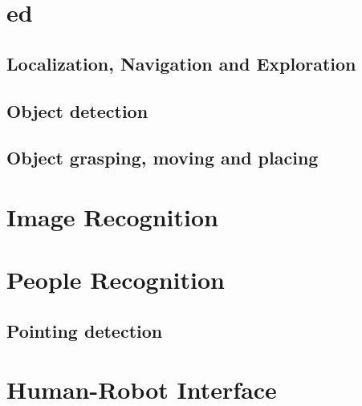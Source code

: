 \documentclass[runningheads,a4paper]{llncs}
\begin{document}
\section{\acrfull{ed}}


\subsection{Localization, Navigation and Exploration}


\subsection{Object detection}


\subsection{Object grasping, moving and placing}


\section{Image Recognition}


\section{People Recognition}

\subsection{Pointing detection}

%

%

%

\section{Human-Robot Interface}

\end{document}
